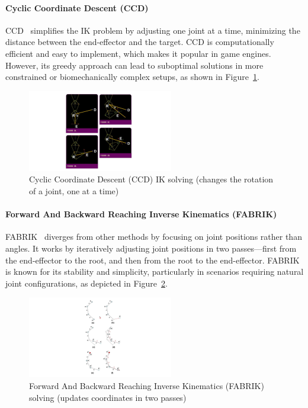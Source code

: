 \documentclass[../../main.tex]{subfiles}
\begin{document}
\paragraph{Cyclic Coordinate Descent (CCD)} CCD~\cite{kenwright2012inverse} simplifies the IK problem by adjusting one joint at a time, minimizing the distance between the end-effector and the target. CCD is computationally efficient and easy to implement, which makes it popular in game engines. However, its greedy approach can lead to suboptimal solutions in more constrained or biomechanically complex setups, as shown in Figure~\ref{fig:ccdik}.

\begin{figure}
  \centering \includegraphics[width = 2.5in]{chapters/pose_correction/images/ccdik.png}
  \caption{Cyclic Coordinate Descent (CCD) IK solving (changes the rotation of a joint, one at a time)}
  \label{fig:ccdik}
\end{figure}

\paragraph{Forward And Backward Reaching Inverse Kinematics (FABRIK)} FABRIK~\cite{aristidou2011fabrik} diverges from other methods by focusing on joint positions rather than angles. It works by iteratively adjusting joint positions in two passes—first from the end-effector to the root, and then from the root to the end-effector. FABRIK is known for its stability and simplicity, particularly in scenarios requiring natural joint configurations, as depicted in Figure~\ref{fig:fabrik}.

\begin{figure}
  \centering \includegraphics[width = 2.5in]{chapters/pose_correction/images/fabrik.png}
  \caption{Forward And Backward Reaching Inverse Kinematics (FABRIK) solving (updates coordinates in two passes)}
  \label{fig:fabrik}
\end{figure}
\end{document}
